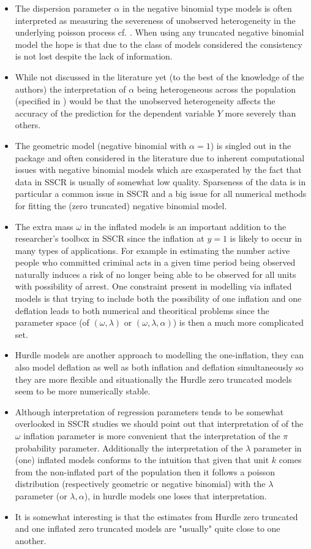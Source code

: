 \documentclass[
]{jss}
\newcommand{\1}{\mathcal{I}} \newcommand{\bZero}{\boldsymbol{0}}
\begin{document}
\begin{itemize}
  \item The dispersion parameter $\alpha$ in the negative binomial type models is often interpreted as measuring the severeness of unobserved heterogeneity in the underlying poisson process cf. \cite{ztnegbin}. When using any truncated negative binomial model the hope is that due to the class of models considered the consistency is not lost despite the lack of information.
  \item While not discussed in the literature yet (to the best of the knowledge of the authors) the interpretation of $\alpha$ being heterogeneous across the population (specified in ) would be that the unobserved heterogeneity affects the accuracy of the prediction for the dependent variable $Y$ more severely than others.
  \item The geometric model (negative binomial with $\alpha=1$) is singled out in the package and often considered in the literature due to inherent computational issues with negative binomial models which are exasperated by the fact that data in SSCR is usually of somewhat low quality. Sparseness of the data is in particular a common issue in SSCR and a big issue for all numerical methods for fitting the (zero truncated) negative binomial model.
  \item The extra mass $\omega$ in the inflated models is an important addition to the researcher's toolbox in SSCR since the inflation at $y=1$ is likely to occur in many types of applications. For example in estimating the number active people who committed criminal acts in a given time period being observed naturally induces a risk of no longer being able to be observed for all units with possibility of arrest. One constraint present in modelling via inflated models is that trying to include both the possibility of one inflation and one deflation leads to both numerical and theoritical problems since the parameter space (of $(\omega, \lambda)$ or $(\omega, \lambda, \alpha)$) is then a much more complicated set.
  \item Hurdle models are another approach to modelling the one-inflation, they can also model deflation as well as both inflation and deflation simultaneously so they are more flexible and situationally the Hurdle zero truncated models seem to be more numerically stable.
  \item Although interpretation of regression parameters tends to be somewhat overlooked in SSCR studies we should point out that interpretation of  of the $\omega$ inflation parameter is more convenient that the interpretation of the $\pi$ probability parameter. Additionally the interpretation of the $\lambda$ parameter in (one) inflated models conforms to the intuition that given that unit $k$ comes from the non-inflated part of the population then it follows a poisson distribution (respectively geometric or negative binomial) with the $\lambda$ parameter (or $\lambda,\alpha$), in hurdle models one loses that interpretation.
  \item It is somewhat interesting is that the estimates from Hurdle zero truncated and one inflated zero truncated models are "usually" quite close to one another.
\end{itemize}
\end{document}
